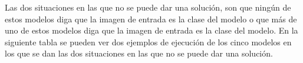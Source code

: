 \documentclass[12pt,a4paper]{article}
\begin{document}
Las dos situaciones en las que no se puede dar una solución, son que ningún de estos modelos diga que la imagen de entrada es la clase del modelo o que más de uno de estos modelos diga que la imagen de entrada es la clase del modelo. En la siguiente tabla se pueden ver dos ejemplos de ejecución de los cinco modelos en los que se dan las dos situaciones en las que no se puede dar una solución.

\begin{table}[H]
\centering
{}
\end{table}
\end{document}
